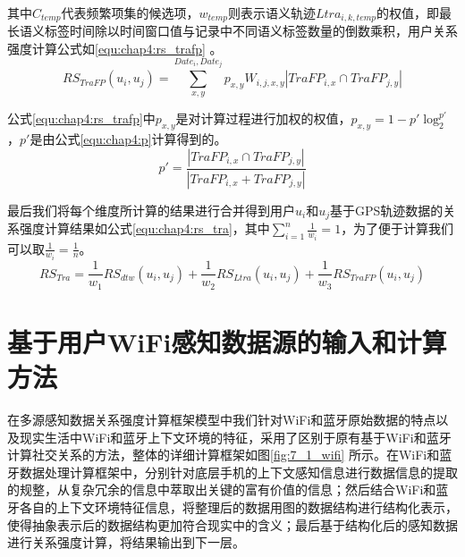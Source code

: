 \par 其中$C_{temp}$代表频繁项集的候选项，$w_{temp}$则表示语义轨迹$Ltra_{i,k,temp}$的权值，即最长语义标签时间除以时间窗口值与记录中不同语义标签数量的倒数乘积，用户关系强度计算公式如\ref{equ:chap4:rs_trafp} 。
\begin{equation}
\label{equ:chap4:rs_trafp}
RS_{TraFP}(u_{i},u_{j})=\sum_{x ,y }^{ Date_{i}, Date_{j}} p_{x,y} W_{i,j,x,y} \left |TraFP_{i,x} \cap TraFP_{j,y}   \right |
\end{equation}
\par 公式\ref{equ:chap4:rs_trafp}中$p_{x,y}$是对计算过程进行加权的权值，$p_{x,y}=1-{p}'\log_{2}^{{p}'}$，${p}'$是由公式\ref{equ:chap4:p}计算得到的。
\begin{equation}
\label{equ:chap4:p}
{p}'=\frac{\left |TraFP_{i,x} \cap TraFP_{j,y}   \right |}{\left |TraFP_{i,x} + TraFP_{j,y}   \right |}
\end{equation}

\par  最后我们将每个维度所计算的结果进行合并得到用户$u_{i}$和$u_{j}$基于GPS轨迹数据的关系强度计算结果如公式\ref{equ:chap4:rs_tra}，其中$ \sum_{i=1}^{n}\frac{1}{w_{i}}=1$，为了便于计算我们可以取$\frac{1}{w_{i}}=\frac{1}{n}$。
\begin{equation}
\label{equ:chap4:rs_tra}
RS_{Tra}=\frac{1}{w_{1}} RS_{dtw}(u_{i},u_{j})+\frac{1}{w_{2}}RS_{Ltra}(u_{i},u_{j})+\frac{1}{w_{3}}RS_{TraFP}(u_{i},u_{j})
\end{equation}
\section{基于用户WiFi感知数据源的输入和计算方法}
\label{sec:wifi_input}
在多源感知数据关系强度计算框架模型中我们针对WiFi和蓝牙原始数据的特点以及现实生活中WiFi和蓝牙上下文环境的特征，采用了区别于原有基于WiFi和蓝牙计算社交关系的方法，整体的详细计算框架如图\ref{fig:7_1_wifi} 所示。在WiFi和蓝牙数据处理计算框架中，分别针对底层手机的上下文感知信息进行数据信息的提取的规整，从复杂冗余的信息中萃取出关键的富有价值的信息；然后结合WiFi和蓝牙各自的上下文环境特征信息，将整理后的数据用图的数据结构进行结构化表示，使得抽象表示后的数据结构更加符合现实中的含义；最后基于结构化后的感知数据进行关系强度计算，将结果输出到下一层。

